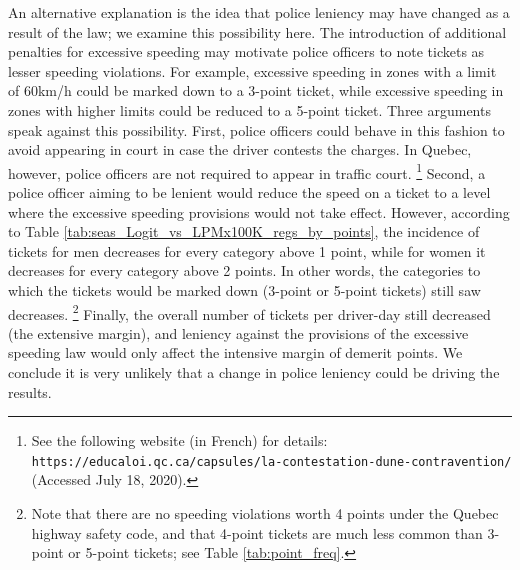 \documentclass{cje}
\begin{document}
An alternative explanation is the idea that police leniency may have changed as a result of the law; 
we examine this possibility here. 
The introduction of additional penalties for excessive speeding may 
motivate police officers to note tickets as lesser speeding violations. 
For example, excessive speeding in zones with a limit of 60km/h 
could be marked down to a 3-point ticket, 
while excessive speeding in zones with higher limits could be reduced to a 5-point ticket. 
Three arguments speak against this possibility. 
First, police officers could behave in this fashion to avoid appearing in court 
in case the driver contests the charges.  
In Quebec, however, police officers are not required to appear in traffic court.%
\footnote{%
See the following website (in French) for details: \texttt{https://educaloi.qc.ca/capsules/la-contestation-dune-contravention/} (Accessed July 18, 2020).}  
%
Second, a police officer aiming to be lenient would reduce the speed on a ticket 
to a level where the excessive speeding provisions would not take effect. 
% 
However, according to 
Table \ref{tab:seas_Logit_vs_LPMx100K_regs_by_points}, 
the incidence of tickets for men decreases for every category above 1 point, 
while for women it decreases for every category above 2 points. 
In other words, the categories to which the tickets would be marked down (3-point or 5-point tickets) still saw decreases.%
\footnote{%
Note that there are no speeding violations worth 4 points under the Quebec highway safety code, and that 4-point tickets are much less common than 3-point or 5-point tickets; see 
Table \ref{tab:point_freq}.
}
% 
Finally, the overall number of tickets per driver-day still decreased (the extensive margin), 
and leniency against the provisions of the excessive speeding law 
would only affect the intensive margin of demerit points. 
We conclude it is very unlikely that a change in police leniency could be driving the results.
\end{document}
